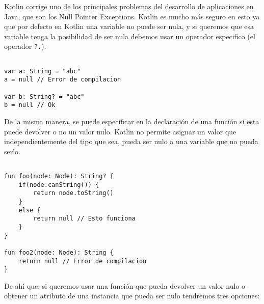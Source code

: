 Kotlin corrige uno de los principales problemas del desarrollo de aplicaciones en Java, que son los Null Pointer Exceptions. Kotlin es mucho más seguro en esto ya que por defecto en Kotlin una variable no puede ser nula, y si queremos que esa variable tenga la posibilidad de ser nula debemos usar un operador especifico (el operador \texttt{?.}).

\begin{verbatim}

var a: String = "abc"
a = null // Error de compilacion

var b: String? = "abc"
b = null // Ok

\end{verbatim}

De la misma manera, se puede especificar en la declaración de una función si esta puede devolver o no un valor nulo. Kotlin no permite asignar un valor que independientemente del tipo que sea, pueda ser nulo a una variable que no pueda serlo.

\begin{verbatim}

fun foo(node: Node): String? {
	if(node.canString()) {
		return node.toString()
	}
	else {
		return null // Esto funciona
	}
}

fun foo2(node: Node): String {
	return null // Error de compilacion
}

\end{verbatim}

De ahí que, si queremos usar una función que pueda devolver un valor nulo o obtener un atributo de una instancia que pueda ser nulo tendremos tres opciones:

